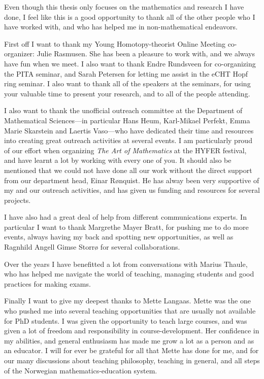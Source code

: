 Even though this thesis only focuses on the mathematics and research I have done, I feel like this is a good opportunity to thank all of the other people who I have worked with, and who has helped me in non-mathematical endeavors. 

First off I want to thank my Young Homotopy-theorist Online Meeting co-organizer: Julie Rasmusen. She has been a pleasure to work with, and we always have fun when we meet. I also want to thank Endre Rundsveen for co-organizing the PITA seminar, and Sarah Petersen for letting me assist in the eCHT Hopf ring seminar. I also want to thank all of the speakers at the seminars, for using your valuable time to present your research, and to all of the people attending. 

I also want to thank the unofficial outreach committee at the Department of Mathematical Sciences---in particular Hans Heum, Karl-Mikael Perfekt, Emma Marie Skarstein and Laertis Vaso---who have dedicated their time and resources into creating great outreach activities at several events. I am particularly proud of our effort when organizing \emph{The Art of Mathematics} at the HYFER festival, and have learnt a lot by working with every one of you. It should also be mentioned that we could not have done all our work without the direct support from our department head, Einar Rønquist. He has alway been very supportive of my and our outreach activities, and has given us funding and resources for several projects. 

I have also had a great deal of help from different communications experts. In particular I want to thank Margrethe Mayer Bratt, for pushing me to do more events, always having my back and spotting new opportunities, as well as Ragnhild Angell Gimse Storrø for several collaborations. 

Over the years I have benefitted a lot from conversations with Marius Thaule, who has helped me navigate the world of teaching, managing students and good practices for making exams. 

Finally I want to give my deepest thanks to Mette Langaas. Mette was the one who pushed me into several teaching opportunities that are usually not available for PhD students. I was given the opportunity to teach large courses, and was given a lot of freedom and responsibility in course-development. Her confidence in my abilities, and general enthusiasm has made me grow a lot as a person and as an educator. I will for ever be grateful for all that Mette has done for me, and for our many discussions about teaching philosophy, teaching in general, and all steps of the Norwegian mathematics-education system.  

